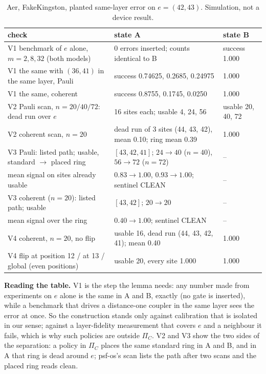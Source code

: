 \documentclass[10pt,a4paper]{article}
\theoremstyle{definition}
\theoremstyle{remark}
\begin{document}
\begin{table}[h]\centering\small
\begin{tabular}{p{}p{}p{}}
\toprule
check & state A & state B\\
\midrule
V1 benchmark of $e$ alone, $m=2,8,32$ (both models) & 0 errors inserted; counts identical to B & success 1.000\\
V1 the same with $(36,41)$ in the same layer, Pauli & success 0.74625, 0.2685, 0.24975 & 1.000\\
V1 the same, coherent & success 0.8755, 0.1745, 0.0250 & 1.000\\
\midrule
V2 Pauli scan, $n=20/40/72$: dead run over $e$ & 16 sites each; usable 4, 24, 56 & usable 20, 40, 72\\
V2 coherent scan, $n=20$ & dead run of 3 sites (44, 43, 42), mean 0.10; ring mean 0.39 & 1.000\\
\midrule
V3 Pauli: listed path; usable, standard $\to$ placed ring & $[43,42,41]$; $24\to40$ ($n=40$), $56\to72$ ($n=72$) & --\\
\quad mean signal on sites already usable & $0.83\to1.00$, $0.93\to1.00$; sentinel CLEAN & --\\
V3 coherent ($n=20$): listed path; usable & $[43,42]$; $20\to20$ & --\\
\quad mean signal over the ring & $0.40\to1.00$; sentinel CLEAN & --\\
\midrule
V4 coherent, $n=20$, no flip & usable 16, dead run (44, 43, 42, 41); mean 0.40 & 1.000\\
V4 flip at position 12 / at 13 / global (even positions) & usable 20, every site 1.000 & 1.000\\
\bottomrule
\end{tabular}
\caption{Aer, FakeKingston, planted same-layer error on $e=(42,43)$. Simulation, not a device result.}
\label{tab:sim}
\end{table}

\textbf{Reading the table.} V1 is the step the lemma needs: any number made from experiments on $e$ alone is the same
in A and B, exactly (no gate is inserted), while a benchmark that drives a distance-one coupler in the same layer sees
the error at once. So the construction stands only against calibration that is isolated in our sense; against a
layer-fidelity measurement that covers $e$ and a neighbour it fails, which is why such policies are outside $\Pi_C$.
V2 and V3 show the two sides of the separation: a policy in $\Pi_C$ places the same standard ring in A and B, and in A
that ring is dead around $e$; psf-os's scan lists the path after two scans and the placed ring reads clean.
\end{document}
